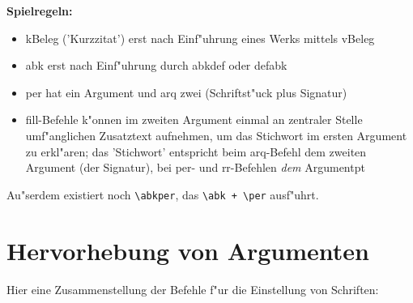 \documentclass[12pt,a4paper]{article}
\newcommand{\pdfko}[1]{\kern #1pt
                          \strut\ignorespaces}%
\begin{document}
\vspace{5.5ex}\noindent 
\textbf{Spielregeln:}

\begin{itemize}
\item k\hy Beleg ('Kurzzitat') erst nach Einf"uhrung eines Werks mittels v\hy Beleg
\item abk erst nach Einf"uhrung durch abkdef oder defabk
\item per hat ein Argument und arq zwei (Schriftst"uck plus Signatur)
\item fill-Befehle k"onnen im zweiten Argument einmal an zentraler Stelle
      umf"anglichen Zusatztext aufnehmen, um das Stichwort im ersten Argument
      zu erkl"aren; das 'Stichwort' entspricht beim arq-Befehl dem zweiten Argument
      (der Signatur), bei per- und rr-Befehlen \textit{dem} Argument\pdfko{1.5}
\end{itemize}

\vspace{1.5ex}\noindent 
Au"serdem existiert noch \verb|\abkper|, das \verb|\abk + \per| ausf"uhrt.



\newpage
\section{Hervorhebung von \BibArts\hy Argumenten}\label{Sect14}\label{hervor}

Hier eine Zusammenstellung der Befehle f"ur die Einstellung von Schriften: 
\end{document}
